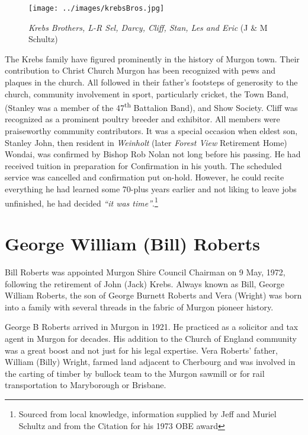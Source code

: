 \begin{figure}
\begin{center}
\texttt{[image: ../images/krebsBros.jpg]}
\caption{{\itshape Krebs Brothers, L-R Sel, Darcy, Cliff, Stan, Les and Eric} {\scriptsize(J \& M Schultz)}}
\end{center}
\end{figure}




The Krebs family have figured prominently in the history of Murgon town. Their contribution to Christ Church Murgon has been recognized with pews and plaques in the church. All followed in their father's footsteps of generosity to the church, community involvement in sport, particularly cricket, the Town Band, (Stanley was a member of the 47\textsuperscript{th} Battalion Band), and Show Society. Cliff was recognized as a prominent poultry breeder and exhibitor. All members were praiseworthy community contributors. It was a special occasion when eldest son, Stanley John, then resident in \emph{Weinholt} (later \emph{Forest View} Retirement Home) Wondai, was confirmed by Bishop Rob Nolan not long before his passing. He had received tuition in preparation for Confirmation in his youth. The scheduled service was cancelled and confirmation put on-hold. However, he could recite everything he had learned some 70-plus years earlier and not liking to leave jobs unfinished, he had decided \emph{``it was time''}.\footnote{Sourced from local knowledge, information supplied by Jeff and Muriel Schultz and from the Citation for his 1973 OBE award}


\section{George William (Bill) Roberts}



Bill Roberts was appointed Murgon Shire Council Chairman on 9 May, 1972, following the retirement of John (Jack) Krebs. Always known as Bill, George William Roberts, the son of George Burnett Roberts and Vera (Wright) was born into a family with several threads in the fabric of Murgon pioneer history.



George B Roberts arrived in Murgon in 1921. He practiced as a solicitor and tax agent in Murgon for decades. His addition to the Church of England community was a great boost and not just for his legal expertise. Vera Roberts' father, William (Billy) Wright, farmed land adjacent to Cherbourg and was involved in the carting of timber by bullock team to the Murgon sawmill or for rail transportation to Maryborough or Brisbane.



